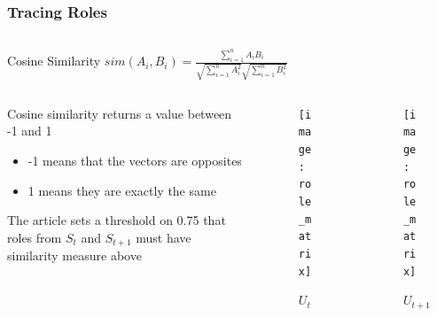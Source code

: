 \begin{frame}
\begin{columns}
\begin{column}{0.5\textwidth}
\begin{figure}
\end{figure}
	\end{column}
\end{columns}

\end{frame}

\begin{frame}
\frametitle{Tracing Roles}
\begin{columns}
\begin{column}{0.5\textwidth}
\begin{block}{\small Cosine Similarity}\centering
$sim(A_{i}, B_{i}) =\frac{\displaystyle\sum_{i=1}^n A_i B_i}{\sqrt{\displaystyle\sum_{i=1}^n A_{i}^2} \sqrt{\displaystyle\sum_{i=1}^n B_{i}^2}} $
\end{block}
\end{column}
\end{columns}

\begin{columns}
\begin{column}{0.5\textwidth}
Cosine similarity returns a value between -1 and 1
\begin{itemize}
\item -1 means that the vectors are opposites
\item 1 means they are exactly the same
\end{itemize} 
The article sets a threshold on 0.75 that roles from $S_t$ and $S_{t+1}$ must have similarity measure above
\end{column}
\begin{column}{0.25\textwidth}
\begin{figure}
\texttt{[image: role\_matrix]}
\caption{$U_t$}
\end{figure}
\end{column}
\begin{column}{0.25\textwidth}
\begin{figure}
\texttt{[image: role\_matrix]}
\caption{$U_{t+1}$}
\end{figure}
\end{column}

\end{columns}
\end{frame}